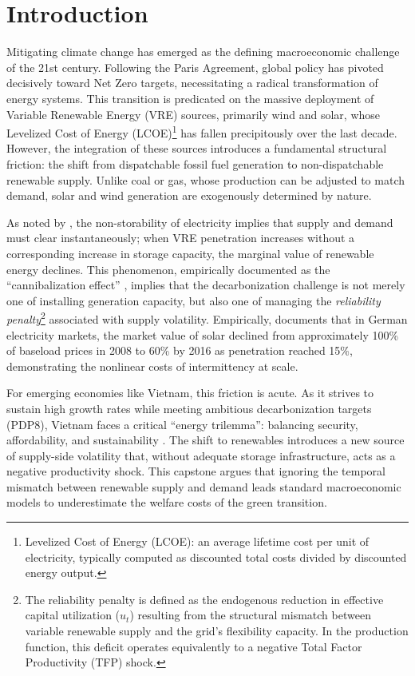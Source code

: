 \documentclass[12pt, a4paper]{article}
\begin{document}
\clearpage
\section{Introduction}

Mitigating climate change has emerged as the defining macroeconomic challenge of the 21st century. Following the Paris Agreement, global policy has pivoted decisively toward Net Zero targets, necessitating a radical transformation of energy systems. This transition is predicated on the massive deployment of Variable Renewable Energy (VRE) sources, primarily wind and solar, whose Levelized Cost of Energy (LCOE)\footnote{Levelized Cost of Energy (LCOE): an average lifetime cost per unit of electricity, typically computed as discounted total costs divided by discounted energy output.} has fallen precipitously over the last decade. However, the integration of these sources introduces a fundamental structural friction: the shift from dispatchable fossil fuel generation to non-dispatchable renewable supply. Unlike coal or gas, whose production can be adjusted to match demand, solar and wind generation are exogenously determined by nature.

As noted by \citet{ambec2012}, the non-storability of electricity implies that supply and demand must clear instantaneously; when VRE penetration increases without a corresponding increase in storage capacity, the marginal value of renewable energy declines. This phenomenon, empirically documented as the ``cannibalization effect'' \citep{hirth2013}, implies that the decarbonization challenge is not merely one of installing generation capacity, but also one of managing the \textit{reliability penalty}\footnote{The reliability penalty is defined as the endogenous reduction in effective capital utilization ($u_t$) resulting from the structural mismatch between variable renewable supply and the grid's flexibility capacity. In the production function, this deficit operates equivalently to a negative Total Factor Productivity (TFP) shock.} associated with supply volatility. Empirically, \citet{hirth2013} documents that in German electricity markets, the market value of solar declined from approximately 100\% of baseload prices in 2008 to 60\% by 2016 as penetration reached 15\%, demonstrating the nonlinear costs of intermittency at scale.

For emerging economies like Vietnam, this friction is acute. As it strives to sustain high growth rates while meeting ambitious decarbonization targets (PDP8), Vietnam faces a critical ``energy trilemma'': balancing security, affordability, and sustainability \citep{liu2022Roles}. The shift to renewables introduces a new source of supply-side volatility that, without adequate storage infrastructure, acts as a negative productivity shock. This capstone argues that ignoring the temporal mismatch between renewable supply and demand leads standard macroeconomic models to underestimate the welfare costs of the green transition.
\end{document}

